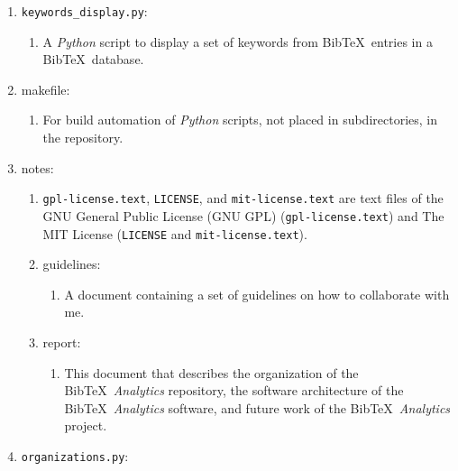 \begin{enumerate}
	\begin{enumerate} \itemsep -2pt
	\item A {\it Python} script to display a set of journal titles from {\sc Bib}\TeX\ entries in a {\sc Bib}\TeX\ database.
	\end{enumerate}
\item {\tt keywords\_display.py}: \vspace{-0.3cm}
	\begin{enumerate} \itemsep -2pt
	\item A {\it Python} script to display a set of keywords from {\sc Bib}\TeX\ entries in a {\sc Bib}\TeX\ database.
	\end{enumerate}
\item makefile: \vspace{-0.3cm}
	\begin{enumerate} \itemsep -2pt
	\item For build automation of {\it Python} scripts, not placed in subdirectories, in the repository.
	\end{enumerate}
\item notes: \vspace{-0.3cm}
	\begin{enumerate} \itemsep -2pt
	\item {\tt gpl-license.text}, {\tt LICENSE}, and {\tt mit-license.text} are text files of the GNU General Public License (GNU GPL) ({\tt gpl-license.text}) and The MIT License ({\tt LICENSE} and {\tt mit-license.text}).
	\item guidelines: \vspace{-0.2cm}
		\begin{enumerate} \itemsep -2pt
		\item A document containing a set of guidelines on how to collaborate with me.
		\end{enumerate}
	\item report: \vspace{-0.2cm}
		\begin{enumerate} \itemsep -2pt
		\item This document that describes the organization of the {\sc Bib}\TeX\ {\it Analytics} repository, the software architecture of the {\sc Bib}\TeX\ {\it Analytics} software, and future work of the {\sc Bib}\TeX\ {\it Analytics} project.
		\end{enumerate}
	\end{enumerate}
\item {\tt organizations.py}: \vspace{-0.3cm}

\end{enumerate}
